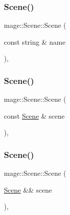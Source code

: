 \subsubsection{\texorpdfstring{Scene()}{Scene()}\hspace{0.1cm}{\footnotesize\ttfamily [1/3]}}
{\footnotesize\ttfamily mage\+::\+Scene\+::\+Scene (\begin{DoxyParamCaption}\item[{const string \&}]{name }\end{DoxyParamCaption})\hspace{0.3cm}{\ttfamily [explicit]}, {\ttfamily [protected]}}

\hypertarget{classmage_1_1_scene_a88d83ccb2e10549d5370f850b2b4c228}{}\label{classmage_1_1_scene_a88d83ccb2e10549d5370f850b2b4c228} 
\subsubsection{\texorpdfstring{Scene()}{Scene()}\hspace{0.1cm}{\footnotesize\ttfamily [2/3]}}
{\footnotesize\ttfamily mage\+::\+Scene\+::\+Scene (\begin{DoxyParamCaption}\item[{const \hyperlink{classmage_1_1_scene}{Scene} \&}]{scene }\end{DoxyParamCaption})\hspace{0.3cm}{\ttfamily [protected]}, {\ttfamily [delete]}}

\hypertarget{classmage_1_1_scene_a35b8fc4242c2348e53014b96416fc3d3}{}\label{classmage_1_1_scene_a35b8fc4242c2348e53014b96416fc3d3} 
\subsubsection{\texorpdfstring{Scene()}{Scene()}\hspace{0.1cm}{\footnotesize\ttfamily [3/3]}}
{\footnotesize\ttfamily mage\+::\+Scene\+::\+Scene (\begin{DoxyParamCaption}\item[{\hyperlink{classmage_1_1_scene}{Scene} \&\&}]{scene }\end{DoxyParamCaption})\hspace{0.3cm}{\ttfamily [protected]}, {\ttfamily [default]}}



